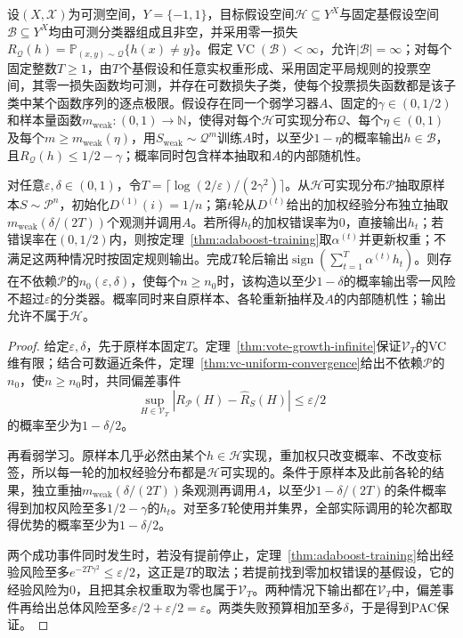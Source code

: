 \begin{theorem}[有限VC维基假设空间下的弱学习提升]
\label{thm:pac-boosting}
\label{thm:finite-class-boosting}
\label{thm:finite-vc-boosting}
设$(X,\mathcal X)$为可测空间，$Y=\{-1,1\}$，目标假设空间$\mathcal H\subseteq Y^X$与固定基假设空间$\mathcal B\subseteq Y^X$均由可测分类器组成且非空，并采用零一损失$R_{\mathcal Q}(h)=\mathbb P_{(x,y)\sim\mathcal Q}\{h(x)\neq y\}$。假定$\operatorname{VC}(\mathcal B)<\infty$，允许$|\mathcal B|=\infty$；对每个固定整数$T\geq1$，由$T$个基假设和任意实权重形成、采用固定平局规则的投票空间，其零一损失函数均可测，并存在可数损失子类，使每个投票损失函数都是该子类中某个函数序列的逐点极限。假设存在同一个弱学习器$A$、固定的$\gamma\in(0,1/2)$和样本量函数$m_{\mathrm{weak}}:(0,1)\to\mathbb N$，使得对每个$\mathcal H$可实现分布$\mathcal Q$、每个$\eta\in(0,1)$及每个$m\geq m_{\mathrm{weak}}(\eta)$，用$S_{\mathrm{weak}}\sim\mathcal Q^m$训练$A$时，以至少$1-\eta$的概率输出$h\in\mathcal B$，且$R_{\mathcal Q}(h)\leq1/2-\gamma$；概率同时包含样本抽取和$A$的内部随机性。

对任意$\varepsilon,\delta\in(0,1)$，令$T=\lceil\log(2/\varepsilon)/(2\gamma^2)\rceil$。从$\mathcal H$可实现分布$\mathcal P$抽取原样本$S\sim\mathcal P^n$，初始化$D^{(1)}(i)=1/n$；第$t$轮从$D^{(t)}$给出的加权经验分布独立抽取$m_{\mathrm{weak}}(\delta/(2T))$个观测并调用$A$。若所得$h_t$的加权错误率为0，直接输出$h_t$；若错误率在$(0,1/2)$内，则按定理~\ref{thm:adaboost-training}取$\alpha^{(t)}$并更新权重；不满足这两种情况时按固定规则输出。完成$T$轮后输出$\operatorname{sign}(\sum_{t=1}^T\alpha^{(t)}h_t)$。则存在不依赖$\mathcal P$的$n_0(\varepsilon,\delta)$，使每个$n\geq n_0$时，该构造以至少$1-\delta$的概率输出零一风险不超过$\varepsilon$的分类器。概率同时来自原样本、各轮重新抽样及$A$的内部随机性；输出允许不属于$\mathcal H$。
\end{theorem}

\begin{proof}
给定$\varepsilon,\delta$，先于原样本固定$T$。定理~\ref{thm:vote-growth-infinite}保证$\mathcal V_T$的VC维有限；结合可数逼近条件，定理~\ref{thm:vc-uniform-convergence}给出不依赖$\mathcal P$的$n_0$，使$n\geq n_0$时，共同偏差事件
\[
 \sup_{H\in\mathcal V_T}|R_{\mathcal P}(H)-\hat R_S(H)|\leq\varepsilon/2
\]
的概率至少为$1-\delta/2$。

再看弱学习。原样本几乎必然由某个$h\in\mathcal H$实现，重加权只改变概率、不改变标签，所以每一轮的加权经验分布都是$\mathcal H$可实现的。条件于原样本及此前各轮的结果，独立重抽$m_{\mathrm{weak}}(\delta/(2T))$条观测再调用$A$，以至少$1-\delta/(2T)$的条件概率得到加权风险至多$1/2-\gamma$的$h_t$。对至多$T$轮使用并集界，全部实际调用的轮次都取得优势的概率至少为$1-\delta/2$。

两个成功事件同时发生时，若没有提前停止，定理~\ref{thm:adaboost-training}给出经验风险至多$e^{-2T\gamma^2}\leq\varepsilon/2$，这正是$T$的取法；若提前找到零加权错误的基假设，它的经验风险为0，且把其余权重取为零也属于$\mathcal V_T$。两种情况下输出都在$\mathcal V_T$中，偏差事件再给出总体风险至多$\varepsilon/2+\varepsilon/2=\varepsilon$。两类失败预算相加至多$\delta$，于是得到PAC保证。
\end{proof}


